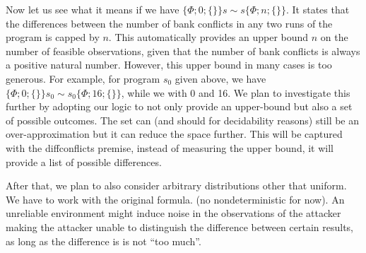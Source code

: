 %
Now let us see what it means if we have $\{\Phi;0; \{\}\}s \sim s\{\Phi;n;\{\}\}$.
%
It states that the differences between the number of bank conflicts in any two runs of the program is capped by $n$.
%
%
This automatically provides an upper bound $n$ on the number of feasible observations, given that the number of bank conflicts is always a positive natural number. 
%
However, this upper bound in many cases is too generous.
%
For example, for program $s_0$ given above, we have $\{\Phi;0; \{\}\}s_0 \sim s_0\{\Phi;16;\{\}\}$, while we with 0 and 16.
%
We plan to investigate this further by adopting our logic to not only provide an upper-bound but also a set of possible outcomes.
%
The set can (and should for decidability reasons) still be an over-approximation but it can reduce the space further.
%
This will be captured with the diffconflicts premise, instead of measuring the upper bound, it will provide a list of possible differences.
%

After that, we plan to also consider arbitrary distributions other that uniform. 
%
We have to work with the original formula.
%
(no nondeterministic for now).
%
An unreliable environment might induce noise in the observations of the attacker making the attacker unable to distinguish the difference between certain results, as long as the difference is is not ``too much''. 









